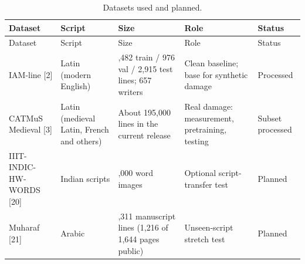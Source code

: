 \documentclass[
  12pt,
  a4paper,
]{report}
\begin{document}
\begin{longtable}[]{@{}
  >{\raggedright\arraybackslash}p{}
  >{\raggedright\arraybackslash}p{}
  >{\raggedright\arraybackslash}p{}
  >{\raggedright\arraybackslash}p{}
  >{\raggedright\arraybackslash}p{}@{}}
\caption{Datasets used and planned.}\tabularnewline
\toprule\noalign{}
\begin{minipage}[b]{\linewidth}\raggedright
Dataset
\end{minipage} & \begin{minipage}[b]{\linewidth}\raggedright
Script
\end{minipage} & \begin{minipage}[b]{\linewidth}\raggedright
Size
\end{minipage} & \begin{minipage}[b]{\linewidth}\raggedright
Role
\end{minipage} & \begin{minipage}[b]{\linewidth}\raggedright
Status
\end{minipage} \\
\midrule\noalign{}
\endfirsthead
\toprule\noalign{}
\begin{minipage}[b]{\linewidth}\raggedright
Dataset
\end{minipage} & \begin{minipage}[b]{\linewidth}\raggedright
Script
\end{minipage} & \begin{minipage}[b]{\linewidth}\raggedright
Size
\end{minipage} & \begin{minipage}[b]{\linewidth}\raggedright
Role
\end{minipage} & \begin{minipage}[b]{\linewidth}\raggedright
Status
\end{minipage} \\
\midrule\noalign{}
\endhead
\bottomrule\noalign{}
\endlastfoot
IAM-line {[}2{]} & Latin (modern English) & 6,482 train / 976 val /
2,915 test lines; 657 writers & Clean baseline; base for synthetic
damage & Processed \\
CATMuS Medieval {[}3{]} & Latin (medieval Latin, French and others) &
About 195,000 lines in the current release & Real damage: measurement,
pretraining, testing & Subset processed \\
IIIT-INDIC-HW-WORDS {[}20{]} & 8 Indian scripts & 872,000 word images &
Optional script-transfer test & Planned \\
Muharaf {[}21{]} & Arabic & 36,311 manuscript lines (1,216 of 1,644
pages public) & Unseen-script stretch test & Planned \\
\end{longtable}
\end{document}
